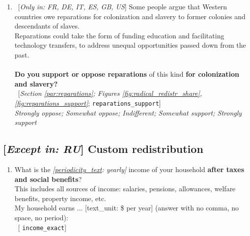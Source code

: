 \documentclass[12pt,english]{article}
\begin{document}
\begin{bibunit}
\begin{enumerate}[resume]
\item ~[\textit{Only in: FR, DE, IT, ES, GB, US}] \label{q:reparations_support} Some people argue that Western countries owe reparations for colonization and slavery to former colonies and descendants of slaves. \\Reparations could take the form of funding education and facilitating technology transfers, to address unequal opportunities passed down from the past. \\\\\textbf{Do you support or oppose reparations} of this kind \textbf{for colonization and slavery?~}\\ 
~[\textit{Section \ref{par:reparations}; Figures \ref{fig:radical_redistr_share}, \ref{fig:reparations_support}}; 
\verb|reparations_support|]
  \\ \textit{Strongly oppose; Somewhat oppose; Indifferent; Somewhat support; Strongly support}

\end{enumerate} 

 \subsection*{[\textit{Except in: RU}] Custom redistribution} 
 \begin{enumerate}[resume] 
\item \label{q:income_exact} What is the \textit{[\hyperlink{tab_features}{periodicity\_text}: yearly]} income of your household \textbf{after taxes and social benefits}?\\This includes all sources of income: salaries, pensions, allowances, welfare benefits, property income, etc.\\My household earns ... [text\_unit: \$ per year] (answer with no comma, no space, no period):\\ 
~[%
\verb|income_exact|]


\end{enumerate}
\end{bibunit}
\end{document}
